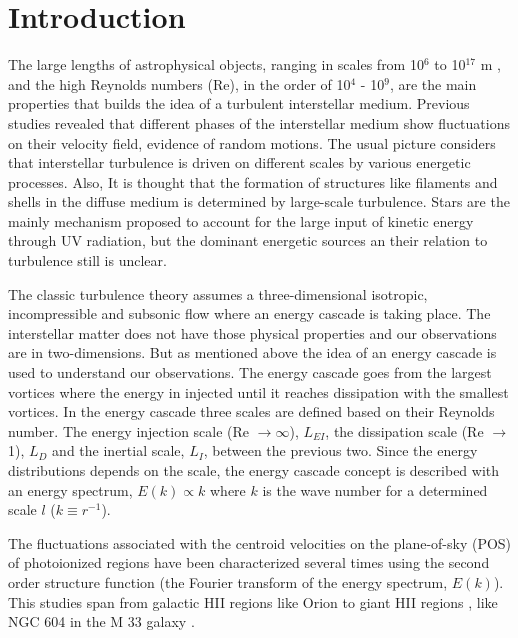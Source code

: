 \documentclass[fleqn,usenatbib, useAMS, a4paper]{mnras}
\begin{document}
\section{Introduction}

The large lengths of astrophysical objects, ranging in scales from 10$^{6}$ to 10$^{17}$ m \citep{2010ApJ...710..853C}, and the high Reynolds numbers (Re), in the order of 10$^{4}$ - 10$^{9}$, are the main properties that builds the idea of a turbulent interstellar medium. Previous studies \citep{1999intu.conf.....F,2004ARA&A..42..211E,scalo2004interstellar} revealed that different phases of the interstellar medium show fluctuations on their velocity field, evidence of random motions. The usual picture considers that interstellar turbulence is driven on different scales by various energetic processes. Also, It is thought that the formation of structures like filaments and shells in the diffuse medium is determined by large-scale turbulence. Stars are the mainly mechanism proposed to account for the large input of kinetic energy through UV radiation, but the dominant energetic sources an their relation to turbulence still is unclear.

The classic turbulence theory \citep{kolm1} assumes a three-dimensional isotropic, incompressible and subsonic flow where an energy cascade is taking place. The interstellar matter does not have those physical properties and our observations are in two-dimensions. But as mentioned above the idea of an energy cascade is used to understand our observations. The energy cascade goes from the largest vortices where the energy in injected until it reaches dissipation with the smallest vortices. In the energy cascade three scales are defined based on their Reynolds number. The energy injection scale (Re $\rightarrow \infty$), $L_{EI}$, the dissipation scale (Re $\rightarrow$ 1), $L_{D}$ and the inertial scale, $L_{I}$, between the previous two. Since the energy distributions depends on the scale, the energy cascade concept is described with an energy spectrum, $E(k) \propto k$ where $k$ is the wave number for a determined scale $l$ ($k \equiv r^{-1}$).

The fluctuations associated with the centroid velocities on the plane-of-sky (POS) of photoionized regions have been characterized several times using the second order structure function (the Fourier transform of the energy spectrum, $E(k)$). This studies span from galactic HII regions like Orion \citep{von1951methode,munch1958internal,castaneda1988,1992ApJ...387..229O,arthur2016turbulence} to giant HII regions \citep{1961MNRAS.122....1F,lagrois2009multi,lagrois2011}, like NGC 604 in the M 33 galaxy \citep{tanco1997,2019arXiv191203543M}.
\end{document}
